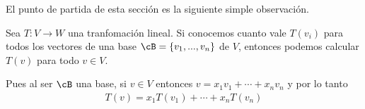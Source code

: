 \documentclass[handout]{beamer} %
\begin{document}
\begin{frame}
    
    El punto de partida de esta sección es la siguiente simple observación.\pause
    
    \begin{observacion}
        Sea $T:V\longrightarrow W$ una tranfomación lineal. Si conocemos cuanto vale $T(v_i)$ para todos los vectores de una base $\cB=\{v_1, ..., v_n\}$ de $V$, entonces podemos calcular $T(v)$ para todo $v\in V$.
    \end{observacion} \pause
    
    Pues al ser $\cB$ una base, si $v\in V$ entonces $v=x_1v_1+\cdots+ x_nv_n$ y por lo tanto
    \begin{align*}
        T(v)=x_1T(v_1)+\cdots+ x_nT(v_n) 
    \end{align*}
    
\end{frame}
\end{document}
